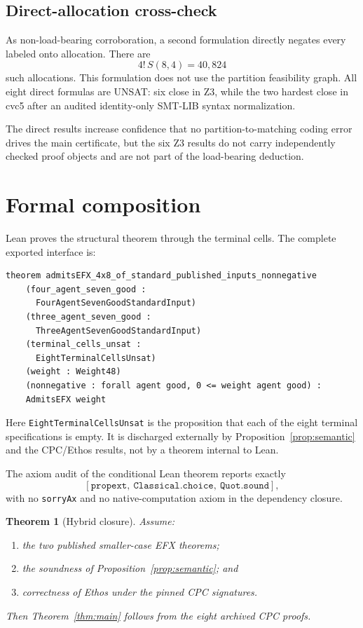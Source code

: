 \documentclass[11pt]{article}
\newtheorem{theorem}{Theorem}[section]
\theoremstyle{definition}
\begin{document}
\subsection{Direct-allocation cross-check}

As non-load-bearing corroboration, a second formulation directly negates
every labeled onto allocation. There are
\[
  4!\,S(8,4)=40,824
\]
such allocations. This formulation does not use the partition feasibility
graph. All eight direct formulas are UNSAT: six close in Z3, while the two
hardest close in cvc5 after an audited identity-only SMT-LIB syntax
normalization.

The direct results increase confidence that no partition-to-matching coding
error drives the main certificate, but the six Z3 results do not carry
independently checked proof objects and are not part of the load-bearing
deduction.

\section{Formal composition}\label{sec:formal}

Lean proves the structural theorem through the terminal cells. The complete
exported interface is:

\noindent\begin{minipage}{\linewidth}
\footnotesize
\begin{verbatim}
theorem admitsEFX_4x8_of_standard_published_inputs_nonnegative
    (four_agent_seven_good :
      FourAgentSevenGoodStandardInput)
    (three_agent_seven_good :
      ThreeAgentSevenGoodStandardInput)
    (terminal_cells_unsat :
      EightTerminalCellsUnsat)
    (weight : Weight48)
    (nonnegative : forall agent good, 0 <= weight agent good) :
    AdmitsEFX weight
\end{verbatim}
\end{minipage}

Here \texttt{EightTerminalCellsUnsat} is the proposition that each of the eight
terminal specifications is empty. It is discharged externally by
Proposition~\ref{prop:semantic} and the CPC/Ethos results, not by a theorem
internal to Lean.

The axiom audit of the conditional Lean theorem reports exactly
\[
  [\texttt{propext},\ \texttt{Classical.choice},\ \texttt{Quot.sound}],
\]
with no \texttt{sorryAx} and no native-computation axiom in the dependency
closure.

\begin{theorem}[Hybrid closure]\label{thm:hybrid}
Assume:
\begin{enumerate}[label=(\roman*),leftmargin=2.2em]
  \item the two published smaller-case EFX theorems;
  \item the soundness of Proposition~\ref{prop:semantic}; and
  \item correctness of Ethos under the pinned CPC signatures.
\end{enumerate}
Then Theorem~\ref{thm:main} follows from the eight archived CPC proofs.
\end{theorem}
\end{document}
